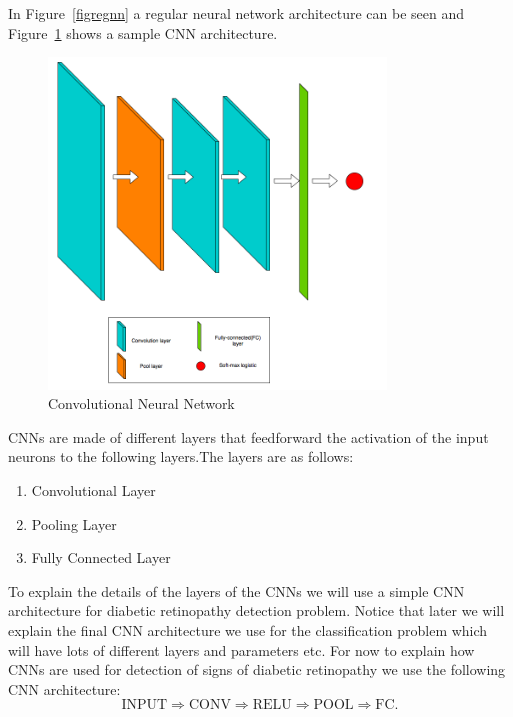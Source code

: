 In Figure~\ref{figregnn} a regular neural network architecture can be seen and Figure~\ref{figconvnet} shows a sample CNN architecture.

\begin{figure}[t]
\centering
\includegraphics[width=0.8\textwidth]{Figures/convnet}
\caption{Convolutional Neural Network}
\label{figconvnet}
\end{figure}

CNNs are made of different layers that feedforward the activation of the input neurons to the following layers.The layers are as follows:

\begin{enumerate}
    \item Convolutional Layer
    \item Pooling Layer
    \item Fully Connected Layer
\end{enumerate}

To explain the details of the layers of the CNNs we will use a simple CNN architecture for diabetic retinopathy detection problem. Notice that later we will explain the final CNN architecture we use for the classification problem which will have lots of different layers and parameters etc. For now to explain how CNNs are used for detection of signs of diabetic retinopathy we use the following CNN architecture:
\[
\text{INPUT} \Rightarrow \text{CONV} \Rightarrow \text{RELU} \Rightarrow \text{POOL} \Rightarrow \text{FC}.
\]

